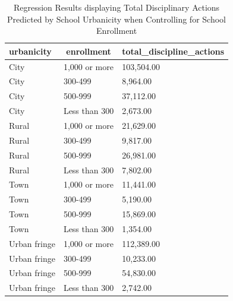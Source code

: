 \documentclass[man]{apa6}
\begin{document}
\begin{table}[tbp]

\begin{center}
\begin{threeparttable}

\caption{\label{tab:model tables}Regression Results displaying Total Disciplinary Actions Predicted by School Urbanicity when Controlling for School Enrollment}

\begin{tabular}{lll}
\toprule
urbanicity & \multicolumn{1}{c}{enrollment} & \multicolumn{1}{c}{total\_discipline\_actions}\\
\midrule
City & 1,000 or more & 103,504.00\\
City & 300-499 & 8,964.00\\
City & 500-999 & 37,112.00\\
City & Less than 300 & 2,673.00\\
Rural & 1,000 or more & 21,629.00\\
Rural & 300-499 & 9,817.00\\
Rural & 500-999 & 26,981.00\\
Rural & Less than 300 & 7,802.00\\
Town & 1,000 or more & 11,441.00\\
Town & 300-499 & 5,190.00\\
Town & 500-999 & 15,869.00\\
Town & Less than 300 & 1,354.00\\
Urban fringe & 1,000 or more & 112,389.00\\
Urban fringe & 300-499 & 10,233.00\\
Urban fringe & 500-999 & 54,830.00\\
Urban fringe & Less than 300 & 2,742.00\\
\bottomrule
\end{tabular}

\end{threeparttable}
\end{center}

\end{table}
\end{document}
